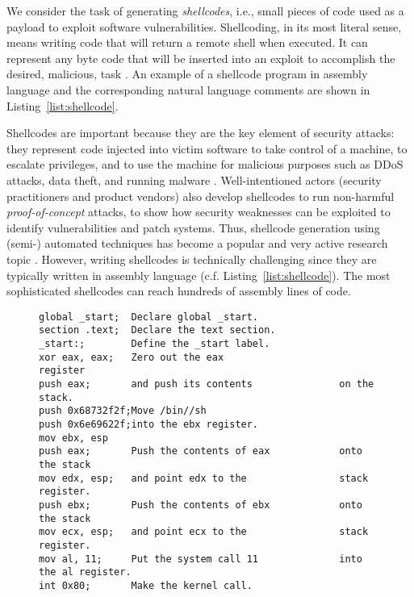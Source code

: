 \documentclass[11pt,a4paper]{article}
\begin{document}
We consider the task of generating \emph{shellcodes}, i.e., small pieces of code used as a payload to exploit software vulnerabilities. Shellcoding, in its most literal sense, means writing code that will return a remote shell when executed. It can represent any byte code that will be inserted into an exploit to accomplish the desired, malicious, task \cite{mason2009english}. An example of a shellcode program in assembly language and the corresponding natural language comments are shown in Listing~\ref{list:shellcode}.


Shellcodes are important because they are the key element of security attacks: they represent code injected into victim software to take control of a machine, to escalate privileges, and to use the machine for malicious purposes such as DDoS attacks, data theft, and running malware \cite{arce2004shellcode}. Well-intentioned actors (security practitioners and product vendors) also develop shellcodes to run non-harmful \emph{proof-of-concept} attacks, to show how security weaknesses can be exploited to identify vulnerabilities and patch systems. Thus, shellcode generation using (semi-) automated techniques has become a popular and very active research topic \cite{bao2017your}. 
However, writing shellcodes is technically challenging since they are typically written in assembly language (c.f. Listing~\ref{list:shellcode}). The most sophisticated shellcodes can reach hundreds of assembly lines of code. 




\begin{figure}[t!]
\footnotesize
\begin{minipage}{\linewidth}
\begin{lstlisting}[caption={x86 assembly code used to spawn \texttt{/bin/sh} shell on Linux OS. Lines 4-5, 6-7-8, 9-10, 11-12 are multi-line snippets generated by four different intents.},label={list:shellcode}]
global _start;  Declare global _start.
section .text;  Declare the text section.
_start:;        Define the _start label.
xor eax, eax;   Zero out the eax                    register 
push eax;       and push its contents               on the stack.
push 0x68732f2f;Move /bin//sh
push 0x6e69622f;into the ebx register.
mov ebx, esp
push eax;       Push the contents of eax            onto the stack 
mov edx, esp;   and point edx to the                stack register.
push ebx;       Push the contents of ebx            onto the stack
mov ecx, esp;   and point ecx to the                stack register.
mov al, 11;     Put the system call 11              into the al register.
int 0x80;       Make the kernel call.
\end{lstlisting}
\end{minipage}
\end{figure}
\end{document}
